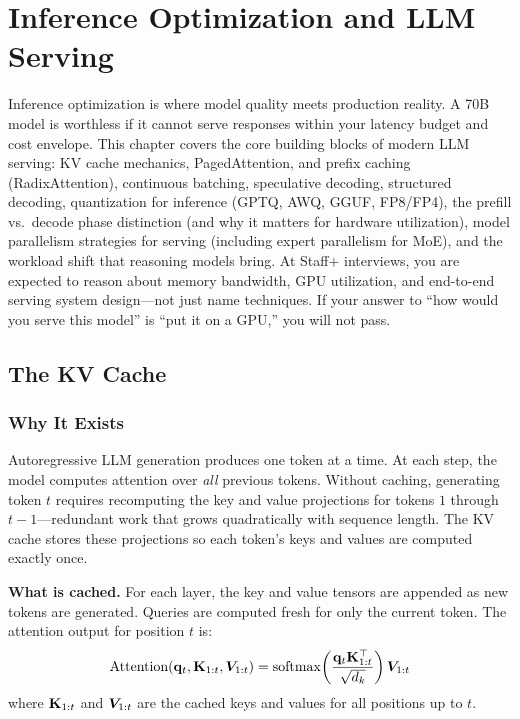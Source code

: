 \chapter{Inference Optimization and LLM Serving}
\label{chap:inference_optimization}

\begin{tldr}
Inference optimization is where model quality meets production reality. A 70B model is worthless if it cannot serve responses within your latency budget and cost envelope. This chapter covers the core building blocks of modern LLM serving: KV cache mechanics, PagedAttention, and prefix caching (RadixAttention), continuous batching, speculative decoding, structured decoding, quantization for inference (GPTQ, AWQ, GGUF, FP8/FP4), the prefill vs.\ decode phase distinction (and why it matters for hardware utilization), model parallelism strategies for serving (including expert parallelism for MoE), and the workload shift that reasoning models bring. At Staff+ interviews, you are expected to reason about memory bandwidth, GPU utilization, and end-to-end serving system design---not just name techniques. If your answer to ``how would you serve this model'' is ``put it on a GPU,'' you will not pass.
\end{tldr}

\section{The KV Cache}
\label{sec:kv_cache}

\subsection{Why It Exists}

Autoregressive LLM generation produces one token at a time. At each step, the model computes attention over \textit{all} previous tokens. Without caching, generating token $t$ requires recomputing the key and value projections for tokens $1$ through $t-1$---redundant work that grows quadratically with sequence length. The KV cache stores these projections so each token's keys and values are computed exactly once.

\textbf{What is cached.} For each layer, the key and value tensors are appended as new tokens are generated. Queries are computed fresh for only the current token. The attention output for position $t$ is:
\[
\text{Attention}(\mathbf{q}_t, \mathbf{K}_{1:t}, \bm{V}_{1:t}) = \operatorname{softmax}\!\left(\frac{\mathbf{q}_t \mathbf{K}_{1:t}^\top}{\sqrt{d_k}}\right) \bm{V}_{1:t}
\]
where $\mathbf{K}_{1:t}$ and $\bm{V}_{1:t}$ are the cached keys and values for all positions up to $t$.

